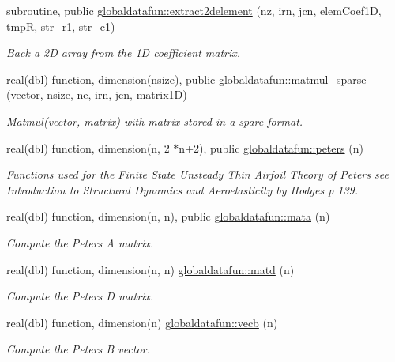 \begin{DoxyCompactItemize}
subroutine, public \hyperlink{namespaceglobaldatafun_a8068755a2ac0857cf1dfc681e43af3a8}{globaldatafun\+::extract2delement} (nz, irn, jcn, elem\+Coef1D, tmpR, str\+\_\+r1, str\+\_\+c1)
\begin{DoxyCompactList}\small\item\em Back a 2D array from the 1D coefficient matrix. \end{DoxyCompactList}\item 
real(dbl) function, dimension(nsize), public \hyperlink{namespaceglobaldatafun_a370a248c97771d5e9b8410dedbfb548c}{globaldatafun\+::matmul\+\_\+sparse} (vector, nsize, ne, irn, jcn, matrix1D)
\begin{DoxyCompactList}\small\item\em Matmul(vector, matrix) with matrix stored in a spare format. \end{DoxyCompactList}\item 
real(dbl) function, dimension(n, 2 $\ast$n+2), public \hyperlink{namespaceglobaldatafun_a9bdeebcd65cb298adc440430560beddc}{globaldatafun\+::peters} (n)
\begin{DoxyCompactList}\small\item\em Functions used for the Finite State Unsteady Thin Airfoil Theory of Peters see Introduction to Structural Dynamics and Aeroelasticity by Hodges p 139. \end{DoxyCompactList}\item 
real(dbl) function, dimension(n, n), public \hyperlink{namespaceglobaldatafun_abc2a555e679f86fd986da760d49b71bc}{globaldatafun\+::mata} (n)
\begin{DoxyCompactList}\small\item\em Compute the Peters A matrix. \end{DoxyCompactList}\item 
real(dbl) function, dimension(n, n) \hyperlink{namespaceglobaldatafun_a5290afbf1d3da671a523a4727bdc7218}{globaldatafun\+::matd} (n)
\begin{DoxyCompactList}\small\item\em Compute the Peters D matrix. \end{DoxyCompactList}\item 
real(dbl) function, dimension(n) \hyperlink{namespaceglobaldatafun_a0ef3145b88a5e2f7679e5309ed885bc4}{globaldatafun\+::vecb} (n)
\begin{DoxyCompactList}\small\item\em Compute the Peters B vector. \end{DoxyCompactList}\item 

\end{DoxyCompactItemize}
